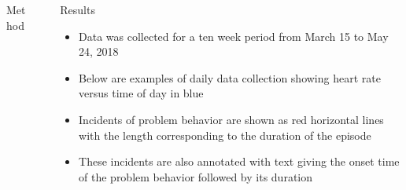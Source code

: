 \documentclass[final]{beamer}
\newlength{\sepwid}
\newlength{\onecolwid}
\newlength{\twocolwid}
\begin{document}
\begin{frame}[t]
\begin{columns}[t]
\begin{column}{\onecolwid}
\begin{alertblock}{Method}
\end{alertblock}


\end{column} %

\begin{column}{\sepwid}\end{column} %

\begin{column}{\twocolwid} %
	

\begin{alertblock}{Results}
	
	\begin{itemize}
		\item Data was collected for a ten week period from March 15 to May 24, 2018
		\item Below are examples of daily data collection showing heart rate versus time of day in blue
		\item Incidents of problem behavior are shown as red horizontal lines with the length corresponding to the duration of the episode
		\item These incidents are also annotated with text giving the onset time of the problem behavior followed by its duration
	\end{itemize}
	
\end{alertblock}


\begin{columns}[t,totalwidth=\twocolwid] %

\begin{column}{\onecolwid}\vspace{-.6in} %




\end{column}
\end{columns}
\end{column}
\end{columns}
\end{frame}
\end{document}
